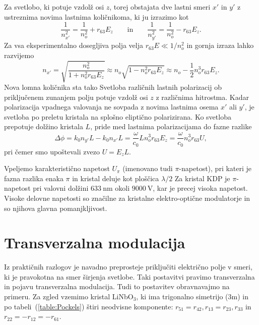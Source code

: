 Za svetlobo, 
ki potuje vzdolž osi $z$, torej obstajata dve lastni smeri $x'$ in $y'$ z ustreznima
novima lastnima količnikoma, ki ju izrazimo kot
\begin{equation}
\frac{1}{n_{x'}^2} = \frac{1}{n_o^2}+ r_{63}E_z \qquad \mathrm{in} \qquad 
\frac{1}{n_{y'}^2} = \frac{1}{n_o^2}- r_{63}E_z. 
\end{equation}
Za vsa eksperimentalno dosegljiva polja velja $r_{63}E\ll1/n_o^2$ in 
gornja izraza lahko razvijemo
\begin{equation}
n_{x'} = \sqrt{\frac{n_o^2}{1+ n_o^2 r_{63}E_z}} \approx n_o \sqrt{1- n_o^2 r_{63}E_z} \approx
n_o - \frac{1}{2}n_o^3 r_{63}E_z.
\end{equation}
Nova lomna količnika sta tako 
Svetloba različnih lastnih polarizacij ob priključenem zunanjem polju potuje vzdolž 
osi $z$ z različnima hitrostma. 
Kadar polarizacija vpadnega valovanja ne sovpada z novima lastnima osema $x'$ ali $y'$, je 
svetloba po preletu kristala na splošno eliptično polarizirana. Ko svetloba
prepotuje dolžino kristala $L$, pride med lastnima polarizacijama do fazne razlike
\begin{equation}
\Delta \phi = k_0 n_{y'} L - k_0 n_{x'} L = \frac{\omega}{c_0}L 
n_o^3 r_{63}E_z = \frac{\omega}{c_0} n_o^3 r_{63}U,
\label{phiAM}
\end{equation} 
pri čemer smo upoštevali zvezo $U = E_zL$. 

Vpeljemo karakteristično napetost $U_\pi$ (imenovano tudi $\pi$-napetost), 
pri kateri je 
fazna razlika enaka $\pi$ in kristal deluje kot ploščica $\lambda/2$
Za kristal KDP je $\pi$-napetost pri valovni 
dolžini $633~\si{\nano\metre}$ okoli  $9000~\si{\volt}$, kar 
je precej visoka napetost. Visoke delovne napetosti
so značilne za kristalne elektro-optične modulatorje in so njihova
glavna pomanjkljivost. 

\section{Transverzalna modulacija}
Iz praktičnih razlogov je navadno preprosteje priključiti električno polje v smeri, ki 
je pravokotna na smer širjenja svetlobe. Taki postavitvi pravimo transverzalna in pojavu
transverzalna modulacija.
Tudi to postavitev obravnavajmo na primeru. Za zgled vzemimo kristal LiNbO$_3$, ki 
ima trigonalno simetrijo (3m) in po tabeli~(\ref{table:Pockels}) štiri 
neodvisne komponente: $r_{51}=r_{42}, r_{13}=r_{23}, r_{33}$ in $r_{22}=-r_{12}=-r_{61}$.

